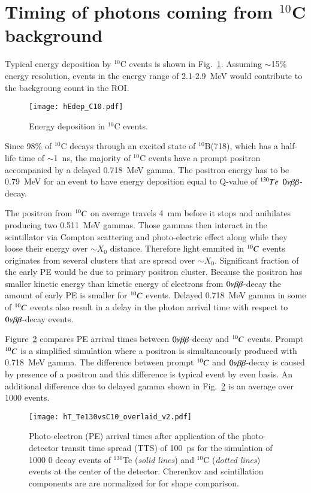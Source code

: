 \section{Timing of photons coming from $^{10}$C background}

Typical energy deposition by $^{10}$C events is shown in
Fig.~\ref{fig:Edep_C10}. Assuming $\sim$15\% energy resolution, events in 
the energy range of 2.1-2.9~MeV would contribute to the backgroung count in 
the ROI.


\begin{figure}[h]
  \centering
  \texttt{[image: hEdep\_C10.pdf]}
  \caption{Energy deposition in $^{10}$C events.}
  \label{fig:Edep_C10}
\end{figure}

Since 98\% of $^{10}$C decays through an excited state of $^{10}$B(718), 
which has a half-life time of $\sim$1~ns, the majority of $^{10}$C events have 
a prompt positron accompanied by a delayed 0.718~MeV gamma. The positron energy
has to be 0.79~MeV for an event to have energy deposition equal to Q-value of
$^{130}Te$ $0\nu\beta\beta$-decay.

The positron from $^{10}C$ on average travels 4~mm before it stops and anihilates
producing two 0.511~MeV gammas. Those gammas then interact in the scintillator via 
Compton scattering and photo-electric effect along while they loose their energy
over $\sim X_0$ distance. Therefore light emmited in $^{10}C$ events originates from
several clusters that are spread over $\sim X_0$. Significant fraction of the 
early PE would be due to primary positron cluster. Because the positron has smaller 
kinetic energy than kinetic energy of electrons from $0\nu\beta\beta$-decay the amount of early 
PE is smaller for $^{10}C$ events. Delayed 0.718~MeV gamma in some of $^{10}C$ events 
also result in a delay in the photon arrival time with respect to $0\nu\beta\beta$-decay events.

Figure~\ref{fig:Arrival_time_C10_overlaid} compares PE arrival times between 
$0\nu\beta\beta$-decay and $^{10}C$ events. Prompt $^{10}C$ is a simplified simulation where 
a positron is simultaneously produced with 0.718~MeV gamma. The difference between
prompt $^{10}C$ and $0\nu\beta\beta$-decay is caused by presence of a positron and this 
difference is typical event by even basis. An additional difference due to delayed
gamma shown in Fig.~\ref{fig:Arrival_time_C10_overlaid} is an average over 1000 events.

\begin{figure}[h]
  \centering
  \texttt{[image: hT\_Te130vsC10\_overlaid\_v2.pdf]}
  \caption{Photo-electron (PE) arrival times after application of the
    photo-detector transit time spread (TTS) of 100~ps for the
    simulation of 1000 0{\nbb} decay events of $^{130}$Te (\emph{solid
      lines}) and $^{10}$C (\emph{dotted lines}) events at the center
    of the detector. Cherenkov and scintillation components are are normalized for 
    for shape comparison.}
\label{fig:Arrival_time_C10_overlaid}
\end{figure}

